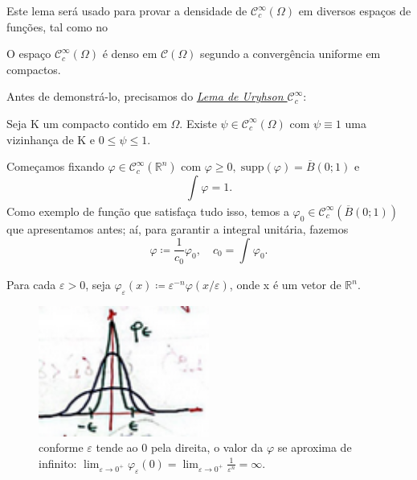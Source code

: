 \documentclass[../distribution_theory_notes.tex]{subfiles}
\begin{document}
Este lema será usado para provar a densidade de \(\mathcal{C}_{c}^{\infty}(\Omega )\) em diversos espaços de funções, tal como no
\begin{theorem*}
	O espaço \(\mathcal{C}_{c}^{\infty}(\Omega )\) é denso em \(\mathcal{C}(\Omega )\) segundo a convergência uniforme em compactos.
\end{theorem*}
Antes de demonstrá-lo, precisamos do \hyperlink{uryhson_lemma}{\textit{Lema de Uryhson \(\mathcal{C}_{c}^{\infty}\)}}:
\hypertarget{uryhson_lemma}{
	\begin{theorem*}
		Seja K um compacto contido em \(\Omega \). Existe \(\psi \in \mathcal{C}_{c}^{\infty}(\Omega )\) com \(\psi \equiv 1\) uma vizinhança de K e \(0\leq \psi \leq 1\).
	\end{theorem*}
}
\begin{proof*}
	Começamos fixando \(\varphi \in \mathcal{C}_{c}^{\infty}(\mathbb{R}^{n})\) com \(\varphi \geq 0,\; \mathrm{supp}(\varphi )=\overline{B}(0;1)\) e
	\[
		\int_{}^{}\varphi = 1.
	\]
	Como exemplo de função que satisfaça tudo isso, temos a \(\varphi_{0}\in \mathcal{C}_{c}^{\infty}(\overline{B}(0;1))\) que apresentamos antes; aí, para garantir a integral unitária, fazemos
	\[
		\varphi \coloneqq \frac{1}{c_{0}}\varphi_{0},\quad c_{0}= \int_{}^{}\varphi_{0}.
	\]

	Para cada \(\varepsilon >0\), seja \(\varphi_{\varepsilon }(x)\coloneqq \varepsilon^{-n}\varphi(x/\varepsilon )\), onde x é um vetor de \(\mathbb{R}^{n}\).
	\begin{figure}[H]
		\begin{center}
			\includegraphics[height=0.5\textheight, width=0.5\textwidth, keepaspectratio]{./Images/phi_epsilon_09.png}
		\end{center}
		\caption{conforme \(\varepsilon \) tende ao 0 pela direita, o valor da \(\varphi \) se aproxima de infinito: \(\lim_{\varepsilon \to 0^{+}}\varphi_{\varepsilon }(0)=\lim_{\varepsilon \to 0^{+}}\frac{1}{\varepsilon^{n}}=\infty.\)}
	\end{figure}


\end{proof*}
\end{document}
